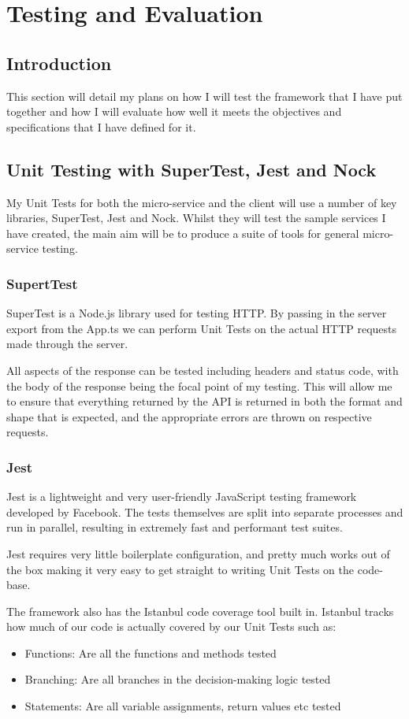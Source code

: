 \chapter{Testing and Evaluation}
\section{Introduction}

This section will detail my plans on how I will test the framework that I have put together and how I will evaluate how well it meets the objectives and specifications that I have defined for it.


\section{Unit Testing with SuperTest, Jest and Nock}

My Unit Tests for both the micro-service and the client will use a number of key libraries, SuperTest, Jest and Nock. Whilst they will test the sample services I have created, the main aim will be to produce a suite of tools for general micro-service testing.
\subsection{SupertTest}
SuperTest is a Node.js library used for testing HTTP. By passing in the server export from the App.ts we can perform Unit Tests on the actual HTTP requests made through the server.

All aspects of the response can be tested including headers and status code, with the body of the response being the focal point of my testing. This will allow me to ensure that everything returned by the API is returned in both the format and shape that is expected, and the appropriate errors are thrown on respective requests.
\subsection{Jest}
Jest is a lightweight and very user-friendly JavaScript testing framework developed by Facebook. The tests themselves are split into separate processes and run in parallel, resulting in extremely fast and performant test suites.

Jest requires very little boilerplate configuration, and pretty much works out of the box making it very easy to get straight to writing Unit Tests on the code-base.

The framework also has the Istanbul code coverage tool built in. Istanbul tracks how much of our code is actually covered by our Unit Tests such as:
\begin{itemize}
    \item Functions: Are all the functions and methods tested
    \item Branching: Are all branches in the decision-making logic tested
    \item Statements: Are all variable assignments, return values etc tested
\end{itemize}


